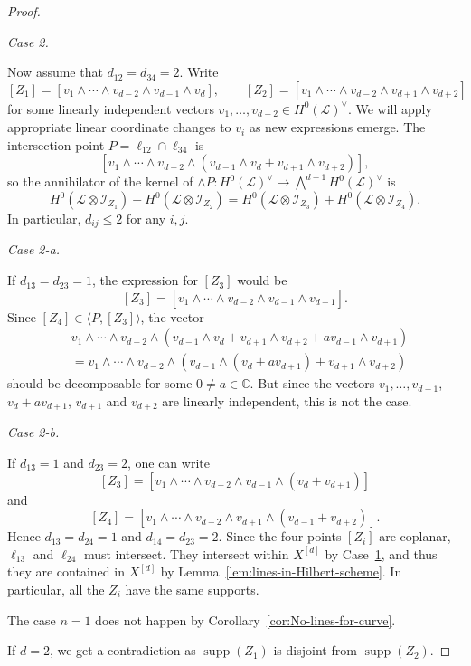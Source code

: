 \documentclass[a4paper]{amsart}
\numberwithin{equation}{section}
\theoremstyle{plain}
\theoremstyle{definition}
\theoremstyle{remark}
\numberwithin{figure}{section}
\numberwithin{table}{section}
\numberwithin{equation}{section}
\def \CC {\mathbb{C}}
\def \Ical {\mathcal{I}}
\def \Lcal {\mathcal{L}}
\DeclareMathOperator{\supp}{supp}
\begin{document}
\begin{proof}
\hypertarget{Case1-2}{\textit{Case 2.}} Now assume that $d_{12} = d_{34} = 2$.
Write
 \[
  [Z_1] = [v_1 \wedge \cdots \wedge v_{d-2} \wedge v_{d-1} \wedge v_d], \qquad
  [Z_2] = [v_1 \wedge \cdots \wedge v_{d-2} \wedge v_{d+1} \wedge v_{d+2}]
 \]
for some linearly independent vectors $v_1, \dots, v_{d+2} \in H^0(\Lcal)^{\vee}$.
We will apply appropriate linear coordinate changes to $v_i$ as new expressions emerge.
The intersection point $P = \ell_{12} \cap \ell_{34}$ is
 \[
  [v_1 \wedge \cdots \wedge v_{d-2} \wedge (v_{d-1} \wedge v_d + v_{d+1} \wedge v_{d+2})],
 \]
so the annihilator of the kernel of $\wedge P : H^0(\Lcal)^{\vee}\rightarrow \bigwedge^{d+1} H^0(\Lcal)^{\vee}$ is
\[
    H^0(\Lcal \otimes \Ical_{Z_1})+H^0(\Lcal \otimes \Ical_{Z_2})=H^0(\Lcal \otimes \Ical_{Z_3})+H^0(\Lcal \otimes \Ical_{Z_4}).
\]
In particular, $d_{ij} \leq 2$ for any $i,j$.

\hypertarget{Case1-2-a}{\textit{Case 2-a.}} If $d_{13} = d_{23} = 1$, the expression for $[Z_3]$ would be
 \[
  [Z_3] = [v_1 \wedge \cdots \wedge v_{d-2} \wedge v_{d-1} \wedge v_{d+1}].
 \]
Since $[Z_4] \in \langle P, [Z_3] \rangle$, the vector
 \begin{align*}
  &v_1 \wedge \cdots \wedge v_{d-2} \wedge (v_{d-1} \wedge v_d + v_{d+1} \wedge v_{d+2} + av_{d-1} \wedge v_{d+1}) \\
  &= v_1 \wedge \cdots \wedge v_{d-2} \wedge (v_{d-1} \wedge (v_d + av_{d+1}) + v_{d+1} \wedge v_{d+2})
 \end{align*}
should be decomposable for some $0 \neq a \in \CC$.
But since the vectors $v_1, \dots, v_{d-1}$, $v_{d}+av_{d+1}$, $v_{d+1}$ and $v_{d+2}$ are linearly independent, this is not the case.

\hypertarget{Case1-2-b}{\textit{Case 2-b.}} If $d_{13} = 1$ and $d_{23} = 2$, one can write
 \[
  [Z_3] = [v_1 \wedge \cdots \wedge v_{d-2} \wedge v_{d-1} \wedge (v_{d} + v_{d+1})]
 \]
and
 \[
  [Z_4] = [v_1 \wedge \cdots \wedge v_{d-2} \wedge v_{d+1} \wedge (v_{d-1} + v_{d+2})].
 \]
Hence $d_{13} = d_{24} = 1$ and $d_{14} = d_{23} = 2$.
Since the four points $[Z_i]$ are coplanar, $\ell_{13}$ and $\ell_{24}$ must intersect.
They intersect within $X^{[d]}$ by Case~\hyperlink{Case1-1}{1}, and thus they are contained in $X^{[d]}$ by Lemma~\ref{lem:lines-in-Hilbert-scheme}.
In particular, all the $Z_i$ have the same supports.

The case $n = 1$ does not happen by Corollary~\ref{cor:No-lines-for-curve}.

If $d = 2$, we get a contradiction as $\supp(Z_1)$ is disjoint from $\supp(Z_2)$.


\end{proof}
\end{document}
